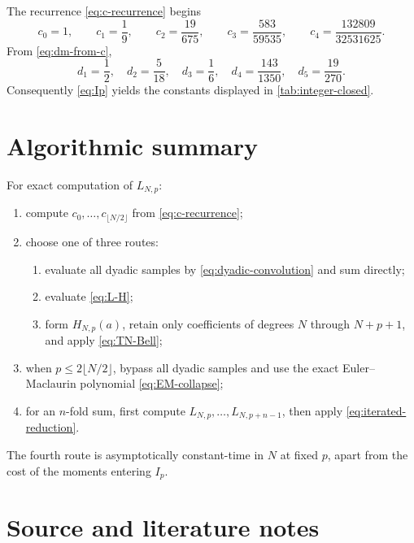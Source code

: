 \documentclass[11pt,oneside]{article}
\numberwithin{equation}{section}
\theoremstyle{definition}
\theoremstyle{remark}
\begin{document}
The recurrence \eqref{eq:c-recurrence} begins
\begin{equation}
 c_0=1,
 \qquad c_1=\frac19,
 \qquad c_2=\frac{19}{675},
 \qquad c_3=\frac{583}{59535},
 \qquad c_4=\frac{132809}{32531625}.
 \label{eq:first-c}
\end{equation}
From \eqref{eq:dm-from-c},
\begin{equation}
 d_1=\frac12,
 \quad d_2=\frac5{18},
 \quad d_3=\frac16,
 \quad d_4=\frac{143}{1350},
 \quad d_5=\frac{19}{270}.
 \label{eq:first-d}
\end{equation}
Consequently \eqref{eq:Ip} yields the constants displayed in
\cref{tab:integer-closed}.

\section{Algorithmic summary}
\label{app:algorithm}

For exact computation of \(L_{N,p}\):
\begin{enumerate}
\item compute \(c_0,\ldots,c_{\lfloor N/2\rfloor}\) from
      \eqref{eq:c-recurrence};
\item choose one of three routes:
  \begin{enumerate}[label=(\alph*)]
  \item evaluate all dyadic samples by \eqref{eq:dyadic-convolution} and sum directly;
  \item evaluate \eqref{eq:L-H};
  \item form \(H_{N,p}(a)\), retain only coefficients of degrees \(N\) through
        \(N+p+1\), and apply \eqref{eq:TN-Bell};
  \end{enumerate}
\item when \(p\le2\lfloor N/2\rfloor\), bypass all dyadic samples and use the exact
      Euler--Maclaurin polynomial \eqref{eq:EM-collapse};
\item for an \(n\)-fold sum, first compute
      \(L_{N,p},\ldots,L_{N,p+n-1}\), then apply
      \eqref{eq:iterated-reduction}.
\end{enumerate}
The fourth route is asymptotically constant-time in \(N\) at fixed \(p\), apart from the
cost of the moments entering \(I_p\).

\section{Source and literature notes}
\label{app:sources}
\end{document}
